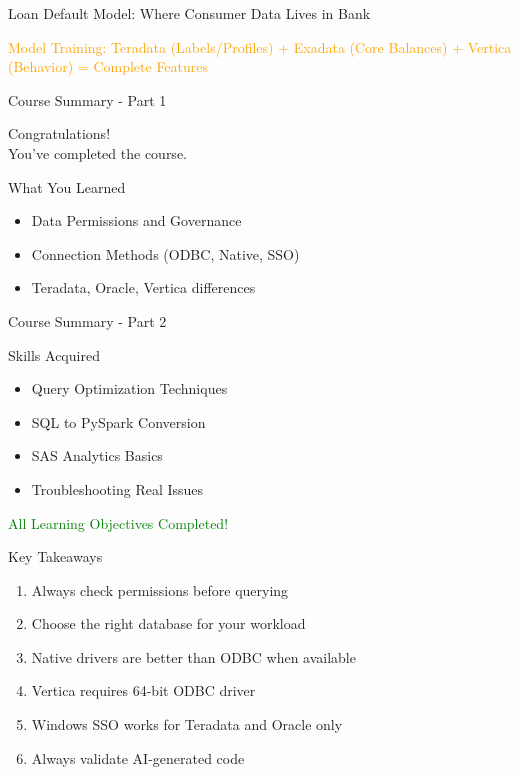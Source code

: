 \documentclass{beamer}
\begin{document}
\begin{frame}{Loan Default Model: Where Consumer Data Lives in Bank}
	\begin{center}
		\textcolor{orange}{\tiny Model Training: Teradata (Labels/Profiles) + Exadata (Core Balances) + Vertica (Behavior) = Complete Features}
	\end{center}
\end{frame}
	
	\begin{frame}{Course Summary - Part 1}
		\begin{center}
			\Huge Congratulations! \\
			\vspace{0.3cm}
			\Large You've completed the course.
		\end{center}
		
		\begin{block}{What You Learned}
			\begin{itemize}
				\item Data Permissions and Governance
				\item Connection Methods (ODBC, Native, SSO)
				\item Teradata, Oracle, Vertica differences
			\end{itemize}
		\end{block}
	\end{frame}
	
	\begin{frame}{Course Summary - Part 2}
		\begin{block}{Skills Acquired}
			\begin{itemize}
				\item Query Optimization Techniques
				\item SQL to PySpark Conversion
				\item SAS Analytics Basics
				\item Troubleshooting Real Issues
			\end{itemize}
		\end{block}
		
		\begin{center}
			\textcolor{green}{All Learning Objectives Completed!}
		\end{center}
	\end{frame}
	
	\begin{frame}{Key Takeaways}
		\begin{enumerate}
			\item Always check permissions before querying
			\item Choose the right database for your workload
			\item Native drivers are better than ODBC when available
			\item Vertica requires 64-bit ODBC driver
			\item Windows SSO works for Teradata and Oracle only
			\item Always validate AI-generated code
		\end{enumerate}
	\end{frame}
	
\end{document}
